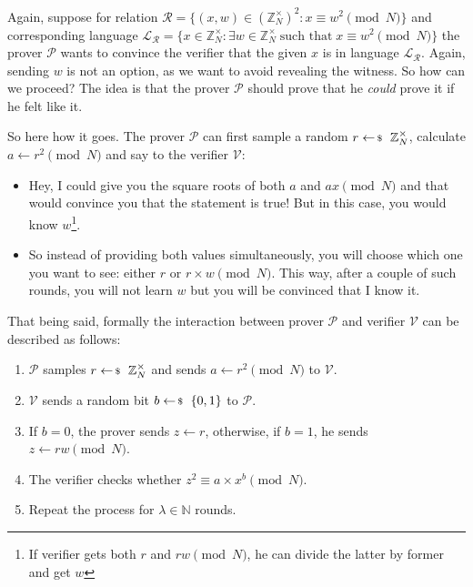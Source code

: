 \documentclass[../lecture-notes-148x210.tex]{subfiles}
\begin{document}
Again, suppose for relation $\mathcal{R} = \{(x,w) \in (\mathbb{Z}_N^{\times})^2: x \equiv w^2 \pmod{N}\}$ and corresponding language $\mathcal{L}_{\mathcal{R}} = \{x \in \mathbb{Z}_N^{\times}: \exists w \in \mathbb{Z}_N^{\times} \; \text{such that} \; x \equiv w^2 \pmod{N}\}$ the prover $\mathcal{P}$ wants to convince the verifier that the given $x$ is in language $\mathcal{L}_{\mathcal{R}}$. Again, sending $w$ is not an option, as we want to avoid revealing the witness. So how can we proceed? The idea is that the prover $\mathcal{P}$ should prove that he \textit{could} prove it if he felt like it. 

So here how it goes. The prover $\mathcal{P}$ can first sample a random $r \leftarrowS \mathbb{Z}_N^{\times}$, calculate $a \gets r^2 \pmod{N}$ and say to the verifier $\mathcal{V}$: 
\begin{itemize}
    \item Hey, I could give you the square roots of both $a$ and $ax \pmod{N}$ and that would convince you that the statement is true! But in this case, you would know $w$\footnote{If verifier gets both $r$ and $rw \pmod{N}$, he can divide the latter by former and get $w$}.
    \item So instead of providing both values simultaneously, you will choose which one you want to see: either $r$ or $r\times w\pmod{N}$. This way, after a couple of such rounds, you will not learn $w$ but you will be convinced that I know it.
\end{itemize}

That being said, formally the interaction between prover $\mathcal{P}$ and verifier $\mathcal{V}$ can be described as follows:
\begin{enumerate}
    \item $\mathcal{P}$ samples $r \leftarrowS \mathbb{Z}_N^{\times}$ and sends $a \gets r^2 \pmod{N}$ to $\mathcal{V}$.
    \item $\mathcal{V}$ sends a random bit $b \leftarrowS \{0,1\}$ to $\mathcal{P}$.
    \item If $b=0$, the prover sends $z \gets r$, otherwise, if $b=1$, he sends $z \gets rw \pmod{N}$.
    \item The verifier checks whether $z^2 \equiv a\times x^{b} \pmod{N}$.
    \item Repeat the process for $\lambda \in \mathbb{N}$ rounds.
\end{enumerate}
\end{document}
